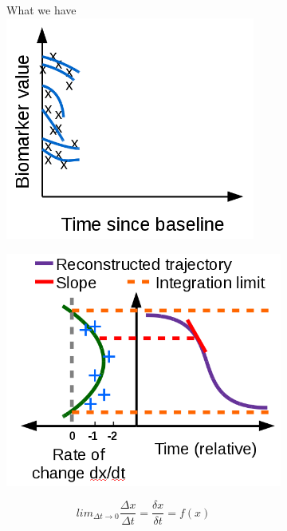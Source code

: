 \begin{figure}[h]
\begin{subfigure}{0.3\textwidth}
     \vspace{1em}
 \end{subfigure}
 \begin{subfigure}{0.3\textwidth}
     \centering
     What we have\\
     \vspace{1em}
     \includegraphics[width=0.90\textwidth,trim= 0 0 0 30]{images/demNewFigs/fig3}
     \vspace{1em}
 \end{subfigure}
 
 \begin{subfigure}{0.34\textwidth}
    \centering
    \includegraphics[width=\textwidth]{images/demNewFigs/fig5}
    \vspace{1em}
 \end{subfigure}
  \begin{subfigure}{0.3\textwidth}
  \centering
  \vspace{-3.5em}
  $$
  lim_{\Delta t \xrightarrow{}  0} \frac{\Delta x}{\Delta t} = \frac{\delta x}{\delta t} = f(x)
  $$
  

\end{subfigure}
\end{figure}
